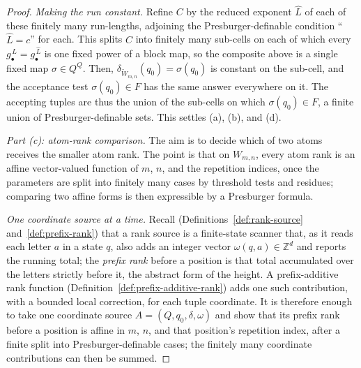 \documentclass[11pt]{article}
\theoremstyle{definition}
\newcommand{\Z}{\mathbb Z}
\begin{document}
\begin{proof}
\vspace{0.5em}
\noindent\emph{Making the run constant.}  Refine $C$ by the reduced exponent $\widehat L$
of each of these finitely many run-lengths, adjoining the Presburger-definable condition
``$\widehat L=c$'' for each.  This splits $C$ into finitely many sub-cells on
each of which every $g_\bullet^{\,L}=g_\bullet^{\,\widehat L}$ is one fixed power
of a block map, so the composite above is a single fixed map $\sigma\in Q^Q$.
Then, $\delta_{\widetilde W_{m,n}}(q_0)=\sigma(q_0)$ is constant on the sub-cell,
and the acceptance test $\sigma(q_0)\in F$ has the same answer
everywhere on it.  The accepting tuples are thus the union of the sub-cells on
which $\sigma(q_0)\in F$, a finite union of Presburger-definable sets.  This settles (a),
(b), and (d).

\vspace{0.5em}
\noindent\emph{Part (c): atom-rank comparison.}
The aim is to decide which of two atoms receives the smaller atom rank.  The
point is that on $W_{m,n}$, every atom rank is an affine vector-valued function
of $m$, $n$, and the
repetition indices, once the parameters are split into finitely many cases by threshold
tests and residues; comparing two affine forms is then expressible 
by a Presburger formula.

\vspace{0.5em}
\noindent\emph{One coordinate source at a time.}  Recall
(Definitions~\ref{def:rank-source} and~\ref{def:prefix-rank})
that a rank source is a finite-state scanner that, as it reads each letter $a$
in a state $q$, also adds an integer vector $\omega(q,a)\in\Z^d$ and reports
the running total;
the \emph{prefix rank} before a position is that total accumulated over the
letters strictly before it, the abstract form of the height.  A
prefix-additive rank function
(Definition~\ref{def:prefix-additive-rank}) adds one such contribution, with a
bounded local correction, for each tuple coordinate.  It is therefore enough
to take one coordinate source $A=(Q,q_0,\delta,\omega)$ and show that its
prefix rank before a position is affine in $m$, $n$, and that position's
repetition index, after a finite split into Presburger-definable cases; the finitely many coordinate
contributions can then be summed.


\end{proof}
\end{document}
